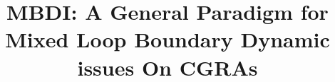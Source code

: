 \documentclass[10pt, conference, compsocconf]{IEEEtran}
\begin{document}
%
\title{MBDI: A General Paradigm for Mixed Loop Boundary Dynamic issues On CGRAs}




%
\end{document}
